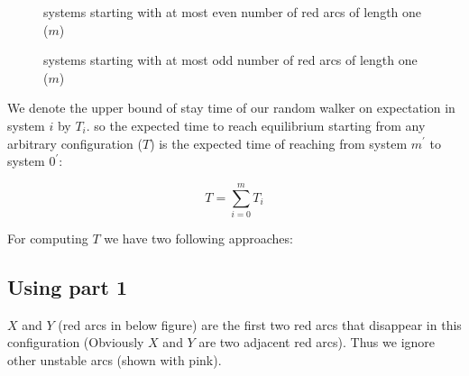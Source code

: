 \documentclass[]{book}
\theoremstyle{definition}
\begin{document}
\begin{figure}[H]
    \centering
    \caption{systems starting with at most even number of red arcs of length one ($m$)}
\end{figure}
\begin{figure}[H]
    \centering
    \caption{systems starting with at most odd number of red arcs of length one ($m$)}
\end{figure}

We denote the upper bound of stay time of our random walker on expectation in system $i$ by $T_{i}$. so the expected time to reach equilibrium starting from any arbitrary configuration ($T$) is the expected time of reaching from system $m^\prime$ to system $0^\prime$:

\begin{equation}
    T = \sum_{i = 0}^{m} T_i
\end{equation}

For computing $T$ we have two following approaches:
\subsection{Using  part 1}

$X$ and $Y$ (red arcs in below figure) are the first two red arcs that disappear in this configuration (Obviously $X$ and $Y$ are two adjacent red arcs). Thus we ignore other unstable arcs (shown with pink).
\end{document}

